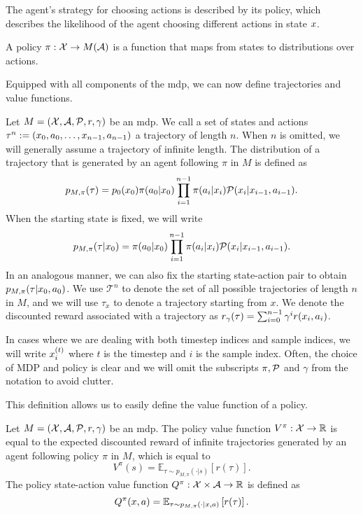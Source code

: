 The agent's strategy for choosing actions is described by its policy, which describes the likelihood of the agent choosing different actions in state $\state$.

\begin{definition}[Policy]
    A policy $\pi: \states \rightarrow M(\actions)$ is a function that maps from states to distributions over actions.
\end{definition}

Equipped with all components of the \ac{mdp}, we can now define trajectories and value functions.

\begin{definition}[Trajectories]
    Let $M = (\states,\actions,\mathcal{P},r,\gamma)$ be an \ac{mdp}.
    We call a set of states and actions $\tau^n := (\state_0,a_0,\dots,\state_{n-1},a_{n-1})$ a trajectory of length $n$.
    When $n$ is omitted, we will generally assume a trajectory of infinite length.
    The distribution of a trajectory that is generated by an agent following $\pi$ in $M$ is defined as $$p_{M, \pi}(\tau) = p_0(\state_0) \pi(a_0|\state_0) \prod_{i=1}^{n-1} \pi(a_i|\state_i) \mathcal{P}(\state_i|\state_{i-1},a_{i-1}).$$
    When the starting state is fixed, we will write $$p_{M,\pi}(\tau|\state_0) = \pi(a_0|\state_0) \prod_{i=1}^{n-1} \pi(a_i|\state_i) \mathcal{P}(\state_i|\state_{i-1},a_{i-1}).$$
    In an analogous manner, we can also fix the starting state-action pair to obtain $p_{M,\pi}(\tau|\state_0,a_0)$.
    We use $\mathcal{T}^n$ to denote the set of all possible trajectories of length $n$ in $M$, and we will use $\tau_x$ to denote a trajectory starting from $x$.
    We denote the discounted reward associated with a trajectory as $r_\gamma(\tau) = \sum_{i=0}^{n-1} \gamma^i r(\state_i,a_i)$.
\end{definition}

In cases where we are dealing with both timestep indices and sample indices, we will write $\state^{(t)}_i$ where $t$ is the timestep and $i$ is the sample index.
Often, the choice of MDP and policy is clear and we will omit the subscripts $\pi,\P$ and $\gamma$ from the notation to avoid clutter.

This definition allows us to easily define the value function of a policy.

\begin{definition}
    Let $M = (\states,\actions,\mathcal{P},r,\gamma)$ be an \ac{mdp}.
    The policy value function $V^\pi: \states \rightarrow \mathbb{R}$ is equal to the expected discounted reward of infinite trajectories generated by an agent following policy $\pi$ in $M$, which is equal to $$V^\pi(s) = \mathbb{E}_{\tau \sim p_{M,\pi}(\cdot|s)} \left[ r(\tau)\right].$$
    The policy state-action value function $Q^\pi: \states \times \actions \rightarrow \mathbb{R}$ is defined as $$Q^\pi(\state,a) = \mathbb{E}_{\tau \sim p_{M,\pi}(\cdot|\state,a)} \left[ r(\tau)\right].$$
\end{definition}

